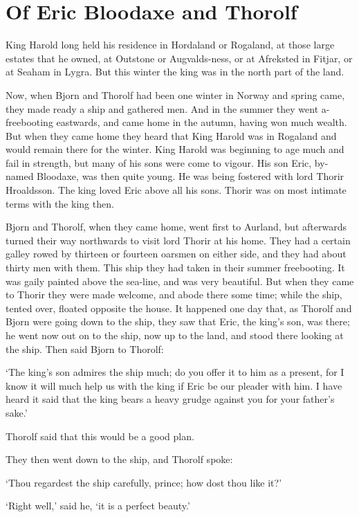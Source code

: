 \chapter{Of Eric Bloodaxe and Thorolf}

King Harold long held his residence in Hordaland or Rogaland, at those large estates that he owned, at Outstone or Augvalds-ness, or at Afreksted in Fitjar, or at Seaham in Lygra. But this winter the king was in the north part of the land.

Now, when Bjorn and Thorolf had been one winter in Norway and spring came, they made ready a ship and gathered men. And in the summer they went a-freebooting eastwards, and came home in the autumn, having won much wealth. But when they came home they heard that King Harold was in Rogaland and would remain there for the winter. King Harold was beginning to age much and fail in strength, but many of his sons were come to vigour. His son Eric, by-named Bloodaxe, was then quite young. He was being fostered with lord Thorir Hroaldsson. The king loved Eric above all his sons. Thorir was on most intimate terms with the king then.

Bjorn and Thorolf, when they came home, went first to Aurland, but afterwards turned their way northwards to visit lord Thorir at his home. They had a certain galley rowed by thirteen or fourteen oarsmen on either side, and they had about thirty men with them. This ship they had taken in their summer freebooting. It was gaily painted above the sea-line, and was very beautiful. But when they came to Thorir they were made welcome, and abode there some time; while the ship, tented over, floated opposite the house. It happened one day that, as Thorolf and Bjorn were going down to the ship, they saw that Eric, the king's son, was there; he went now out on to the ship, now up to the land, and stood there looking at the ship. Then said Bjorn to Thorolf:

`The king's son admires the ship much; do you offer it to him as a present, for I know it will much help us with the king if Eric be our pleader with him. I have heard it said that the king bears a heavy grudge against you for your father's sake.'

Thorolf said that this would be a good plan.

They then went down to the ship, and Thorolf spoke:

`Thou regardest the ship carefully, prince; how dost thou like it?'

`Right well,' said he, `it is a perfect beauty.'

